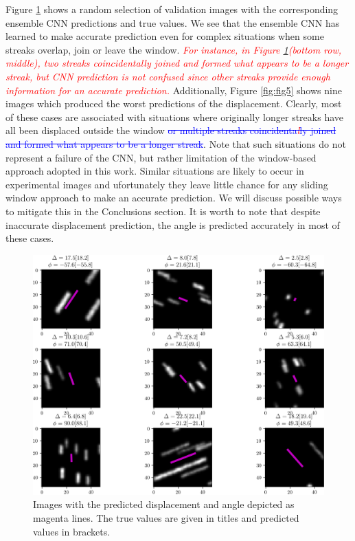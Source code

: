 \documentclass{svjour3}                     %
\newcommand{\new}[1]{\textit{\textcolor{red}{#1}}}
\newcommand{\old}[1]{\textcolor{blue}{\sout{#1}}}
\begin{document}
Figure \ref{fig:fig4} shows a random selection of validation images with the corresponding ensemble CNN predictions and true values. We see that the ensemble CNN has learned to make accurate prediction even for complex situations when some streaks overlap, join or leave the window. \new{For instance, in Figure \ref{fig:fig4}(bottom row, middle), two streaks coincidenta\new{l}ly joined and formed what appears to be a longer streak, but CNN prediction is not confused since other streaks provide enough information for an accurate prediction.} Additionally, Figure \ref{fig:fig5} shows nine images which produced the worst predictions of the displacement. Clearly, most of these cases are associated with situations where originally longer streaks have all been displaced outside the window\old{ or multiple streaks coincidenta\new{l}ly joined and formed what appears to be a longer streak}. Note that such situations do not represent a failure of the CNN, but rather limitation of the window-based approach adopted in this work. Similar situations are likely to occur in experimental images and ufortunately they leave little chance for any sliding window approach to make an accurate prediction. We will discuss possible ways to mitigate this in the Conclusions section. It is worth to note that despite inaccurate displacement prediction, the angle is predicted accurately in most of these cases. 

\begin{figure}
\includegraphics[width=\textwidth]{figs/figure3.png}
\caption{Images with the predicted displacement and angle depicted as magenta lines. The true values are given in titles and predicted values in brackets.}
\label{fig:fig4}
\end{figure}
\end{document}
